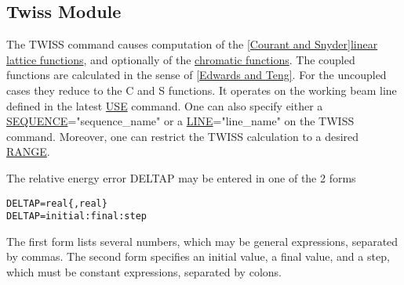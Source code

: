 







\subsection{Twiss Module}






 The TWISS command causes computation of the \href{../Introduction/bibliography.html#courant}{[Courant and Snyder]}\href{../Introduction/tables.html#linear}{linear lattice functions}, and optionally of the \href{../Introduction/tables.html#chrom}{chromatic functions}. The coupled functions are calculated in the sense of \href{../Introduction/bibliography.html#edwards}{[Edwards and Teng]}. For the uncoupled cases they reduce to the C and S functions. It operates on the working beam line defined in the latest \href{../control/general.html#use}{USE} command. One can also specify either a \href{../Introduction/sequence.html}{SEQUENCE}="sequence\_name" or a \href{../Introduction/line.html}{LINE}="line\_name" on the TWISS command. Moreover, one can restrict the TWISS calculation to a desired \href{../Introduction/ranges.html#range}{RANGE}. 

The relative energy error DELTAP may be entered in one of the 2 forms 
\begin{verbatim}
DELTAP=real{,real}
DELTAP=initial:final:step
\end{verbatim} The first form lists several numbers, which may be general expressions, separated by commas. The second form specifies an initial value, a final value, and a step, which must be constant expressions, separated by colons. 

